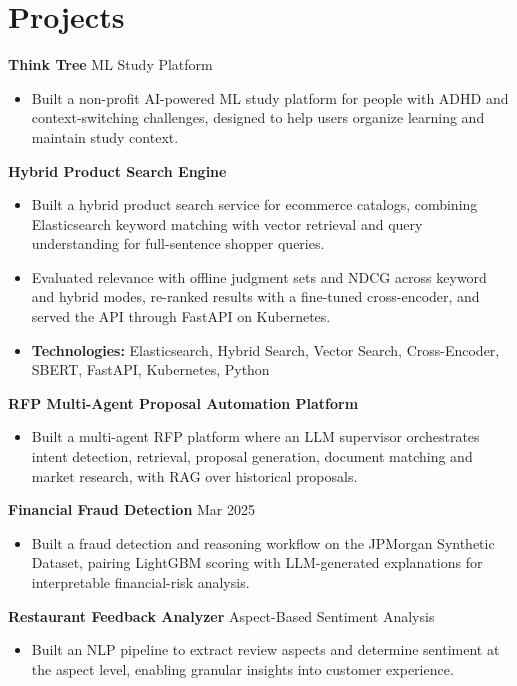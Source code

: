 \documentclass[10pt,a4paper]{article}
\begin{document}
\section{Projects}
\textbf{Think Tree} \textbar{} ML Study Platform\par
\begin{itemize}
  \item Built a non-profit AI-powered ML study platform for people with ADHD and context-switching challenges, designed to help users organize learning and maintain study context.
\end{itemize}
\textbf{Hybrid Product Search Engine}\par
\begin{itemize}
  \item Built a hybrid product search service for ecommerce catalogs, combining Elasticsearch keyword matching with vector retrieval and query understanding for full-sentence shopper queries.
  \item Evaluated relevance with offline judgment sets and NDCG across keyword and hybrid modes, re-ranked results with a fine-tuned cross-encoder, and served the API through FastAPI on Kubernetes.
  \item \textbf{Technologies:} Elasticsearch, Hybrid Search, Vector Search, Cross-Encoder, SBERT, FastAPI, Kubernetes, Python
\end{itemize}
\textbf{RFP Multi-Agent Proposal Automation Platform}\par
\begin{itemize}
  \item Built a multi-agent RFP platform where an LLM supervisor orchestrates intent detection, retrieval, proposal generation, document matching and market research, with RAG over historical proposals.
\end{itemize}
\textbf{Financial Fraud Detection} \textbar{} Mar 2025\par
\begin{itemize}
  \item Built a fraud detection and reasoning workflow on the JPMorgan Synthetic Dataset, pairing LightGBM scoring with LLM-generated explanations for interpretable financial-risk analysis.
\end{itemize}
\textbf{Restaurant Feedback Analyzer} \textbar{} Aspect-Based Sentiment Analysis\par
\begin{itemize}
  \item Built an NLP pipeline to extract review aspects and determine sentiment at the aspect level, enabling granular insights into customer experience.
\end{itemize}
\end{document}
